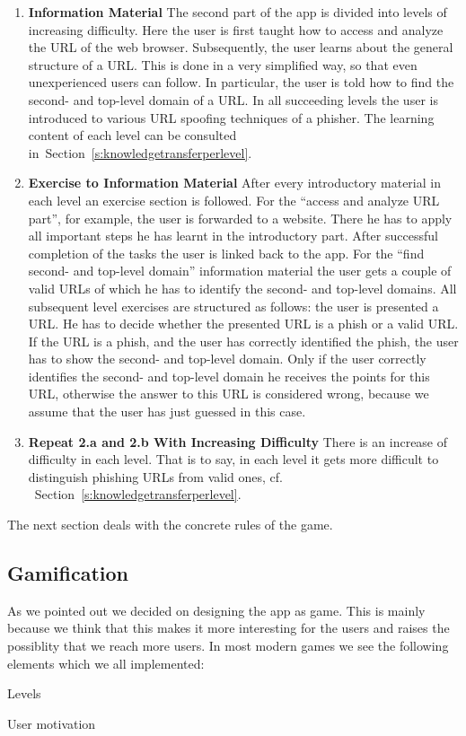 \begin{enumerate}
\begin{enumerate}
	\item \textbf{Information Material} The second part of the app is divided into levels of increasing difficulty.
 Here the user is first taught how to access and analyze the URL of the web browser.
 Subsequently, the user learns about the general structure of a URL.
 This is done in a very simplified way, so that even unexperienced users can follow.
 In particular, the user is told how to find the second- and top-level domain of a URL.
 In all succeeding levels the user is introduced to various URL spoofing techniques of a phisher.
 The learning content of each level can be consulted in~Section~\ref{s:knowledgetransferperlevel}.
		\item \textbf{Exercise to Information Material} After every introductory material in each level an exercise section is followed.
 For the ``access and analyze URL part'', for example, the user is forwarded to a website.
 There he has to apply all important steps he has learnt in the introductory part.
 After successful completion of the tasks the user is linked back to the app.
 For the ``find second- and top-level domain'' information material the user gets a couple of valid URLs of which he has to identify the second- and top-level domains.
 All subsequent level exercises are structured as follows: the user is presented a URL.
 He has to decide whether the presented URL is a phish or a valid URL.
 If the URL is a phish, and the user has correctly identified the phish, the user has to show the second- and top-level domain.
 Only if the user correctly identifies the second- and top-level domain he receives the points for this URL, otherwise the answer to this URL is considered wrong, because we assume that the user has just guessed in this case.

		\item \textbf{Repeat 2.a and 2.b With Increasing Difficulty} There is an increase of difficulty in each level.
 That is to say, in each level it gets more difficult to distinguish phishing URLs from valid ones, cf.
~Section~\ref{s:knowledgetransferperlevel}.
\end{enumerate}
\end{enumerate}

The next section deals with the concrete rules of the game.

\subsection{Gamification}
As we pointed out we decided on designing the app as game.
This is mainly because we think that this makes it more interesting for the users and raises the possiblity that we reach more users.
In most modern games we see the following elements which we all implemented:
\begin{description}
\item[Levels]
\end{description}
User motivation

